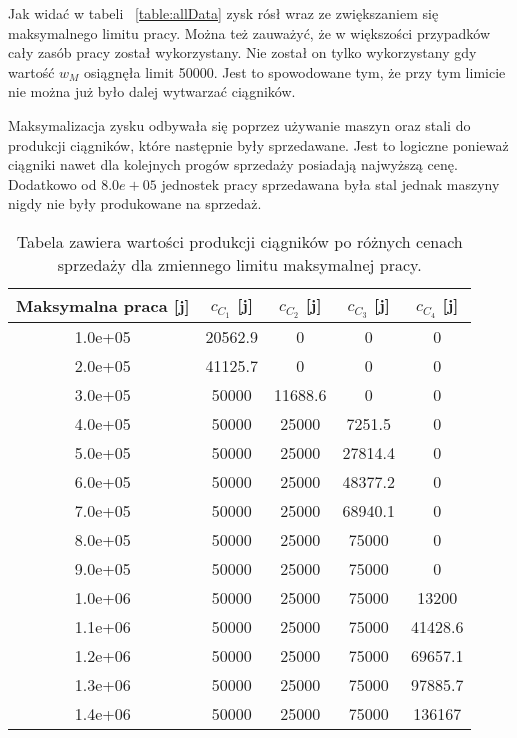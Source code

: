 \documentclass{article}
\begin{document}
Jak widać w tabeli ~\ref{table:allData} zysk rósł wraz ze zwiększaniem się maksymalnego limitu pracy. Można też zauważyć, że w większości przypadków cały zasób pracy został wykorzystany. Nie został on
tylko wykorzystany gdy wartość $w_M$ osiągnęła limit 50000. Jest to spowodowane tym, że przy tym limicie nie można już było dalej wytwarzać ciągników.

Maksymalizacja zysku odbywała się poprzez używanie maszyn oraz stali do produkcji ciągników, które następnie były sprzedawane. Jest to logiczne ponieważ ciągniki nawet dla kolejnych progów sprzedaży posiadają
najwyższą cenę. Dodatkowo od $8.0e+05$ jednostek pracy sprzedawana była stal jednak maszyny nigdy nie były produkowane na sprzedaż.

\begin{table}[H]
  \begin{center}
    \begin{tabular}{c c c c c }
      Maksymalna praca [j]& $c_C_1$ [j]& $c_C_2$ [j]& $c_C_3$ [j]& $c_C_4$ [j] \\
      \hline
      1.0e+05  &20562.9  &0        &0        &0 \\
      2.0e+05  &41125.7  &0        &0        &0 \\
      3.0e+05  &50000    &11688.6  &0        &0 \\
      4.0e+05  &50000    &25000    &7251.5   &0 \\
      5.0e+05  &50000    &25000    &27814.4  &0 \\
      6.0e+05  &50000    &25000    &48377.2  &0 \\
      7.0e+05  &50000    &25000    &68940.1  &0 \\
      8.0e+05  &50000    &25000    &75000    &0 \\
      9.0e+05  &50000    &25000    &75000    &0 \\
      1.0e+06  &50000    &25000    &75000    &13200 \\
      1.1e+06  &50000    &25000    &75000    &41428.6 \\
      1.2e+06  &50000    &25000    &75000    &69657.1 \\
      1.3e+06  &50000    &25000    &75000    &97885.7 \\
      1.4e+06  &50000    &25000    &75000    &136167 
    \end{tabular} 
    \caption{\label{table:partialData}Tabela zawiera wartości produkcji ciągników po różnych cenach sprzedaży dla zmiennego limitu maksymalnej pracy.}
  \end{center}
\end{table}
\end{document}
